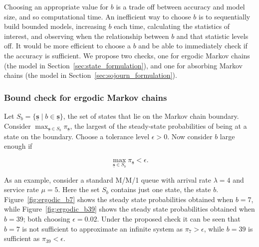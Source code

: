 \documentclass{article}
\begin{document}
Choosing an appropriate value for $b$ is a trade off between accuracy and model
size, and so computational time. An inefficient way to choose $b$ is to
sequentially build bounded models, increasing $b$ each time, calculating the
statistics of interest, and observing when the relationship between $b$ and that
statistic levels off.
It would be more efficient to choose a $b$ and be able to immediately check if
the accuracy is sufficient. We propose two checks, one for ergodic Markov
chains (the model in Section~\ref{sec:state_formulation}), and one for absorbing
Markov chains (the model in Section~\ref{sec:sojourn_formulation}).


\subsubsection{Bound check for ergodic Markov chains}\label{sec:ergodic_check}
Let $S_b = \{\underline{\mathbf{s}} \;|\; b \in \underline{\mathbf{s}}\}$, the
set of states that lie on the Markov chain boundary. Consider
$\max_{\underline{\mathbf{s}} \in S_b} \pi_{\underline{\mathbf{s}}}$, the
largest of the steady-state probabilities of being at a state on the boundary.
Choose a tolerance level $\epsilon > 0$. Now consider $b$ large enough if

\begin{equation}
\max_{\underline{\mathbf{s}} \in S_b} \pi_{\underline{\mathbf{s}}} < \epsilon.
\end{equation}

As an example, consider a standard M/M/1 queue with arrival rate $\lambda = 4$
and service rate $\mu = 5$.
Here the set $S_b$ contains just one state, the state $b$.
Figure~\ref{fig:ergodic_b7} shows the steady state probabilities obtained when
$b=7$, while Figure~\ref{fig:ergodic_b39} shows the steady state probabilities
obtained when $b=39$; both choosing $\epsilon=0.02$.
Under the proposed check it can be seen that $b=7$ is not sufficient to
approximate an infinite system as $\pi_7 > \epsilon$, while $b=39$ is sufficient
as $\pi_{39} < \epsilon$.
\end{document}
